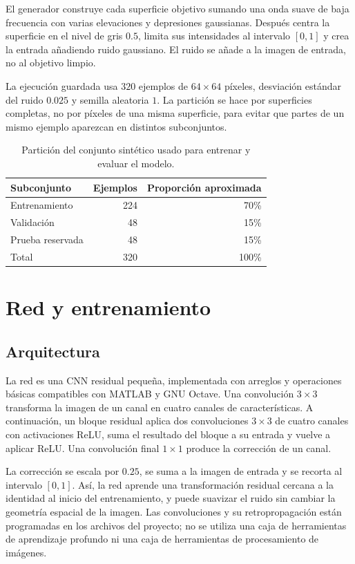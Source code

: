 \documentclass[12pt,a4paper]{article}
\begin{document}
El generador construye cada superficie objetivo sumando una onda suave de baja frecuencia con varias elevaciones y depresiones gaussianas. Después centra la superficie en el nivel de gris \(0.5\), limita sus intensidades al intervalo \([0,1]\) y crea la entrada añadiendo ruido gaussiano. El ruido se añade a la imagen de entrada, no al objetivo limpio.

La ejecución guardada usa \(320\) ejemplos de \(64\times64\) píxeles, desviación estándar del ruido \(0.025\) y semilla aleatoria \(1\). La partición se hace por superficies completas, no por píxeles de una misma superficie, para evitar que partes de un mismo ejemplo aparezcan en distintos subconjuntos.

\begin{table}[H]
  \centering
  \caption{Partición del conjunto sintético usado para entrenar y evaluar el modelo.}
  \label{tab:data-splits}
  \begin{tabular}{lrr}
    \hline
    Subconjunto & Ejemplos & Proporción aproximada \\
    \hline
    Entrenamiento & 224 & 70\% \\
    Validación & 48 & 15\% \\
    Prueba reservada & 48 & 15\% \\
    \hline
    Total & 320 & 100\% \\
    \hline
  \end{tabular}
\end{table}

\section{Red y entrenamiento}

\subsection{Arquitectura}

La red es una CNN residual pequeña, implementada con arreglos y operaciones básicas compatibles con MATLAB y GNU Octave. Una convolución \(3\times3\) transforma la imagen de un canal en cuatro canales de características. A continuación, un bloque residual aplica dos convoluciones \(3\times3\) de cuatro canales con activaciones ReLU, suma el resultado del bloque a su entrada y vuelve a aplicar ReLU. Una convolución final \(1\times1\) produce la corrección de un canal.

La corrección se escala por \(0.25\), se suma a la imagen de entrada y se recorta al intervalo \([0,1]\). Así, la red aprende una transformación residual cercana a la identidad al inicio del entrenamiento, y puede suavizar el ruido sin cambiar la geometría espacial de la imagen. Las convoluciones y su retropropagación están programadas en los archivos del proyecto; no se utiliza una caja de herramientas de aprendizaje profundo ni una caja de herramientas de procesamiento de imágenes.
\end{document}
